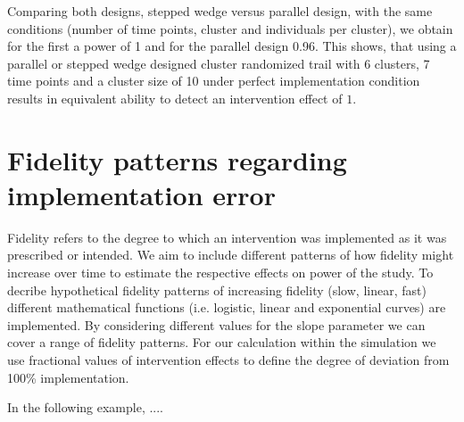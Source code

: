 \documentclass{article}\usepackage[]{graphicx}\usepackage[]{color}
\begin{document}
Comparing both designs, stepped wedge versus parallel design, with the same conditions (number of time points, cluster and individuals per cluster), we obtain for the first a power of 1 and for the parallel design 0.96. This shows, that using a parallel or stepped wedge designed cluster randomized trail with 6 clusters, 7 time points and a cluster size of 10 under perfect implementation condition results in equivalent ability to detect an intervention effect of $1$.



\section{Fidelity patterns regarding implementation error}

Fidelity refers to the degree to which an intervention was implemented as it was prescribed or intended. 
We aim to include different patterns of how fidelity might increase over time to estimate the respective effects on power of the study. To decribe hypothetical fidelity patterns of increasing fidelity (slow, linear, fast) different mathematical functions (i.e. logistic, linear and exponential curves) are implemented. By considering different values for the slope parameter we can cover a range of fidelity patterns. For our calculation within the simulation we use fractional values of intervention effects to define the degree of deviation from 100\% implementation. 

In the following example, ....
\end{document}
